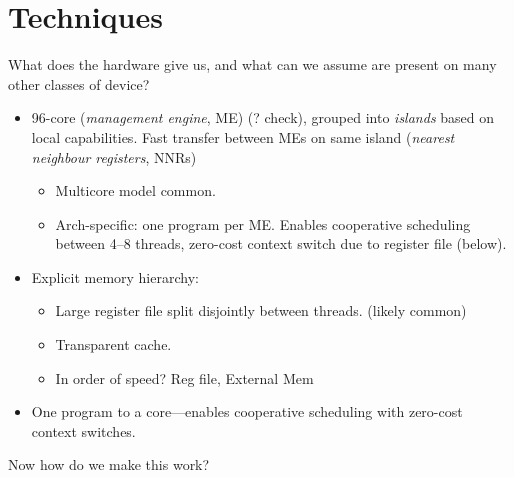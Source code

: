 \documentclass[sigconf,natbib=false]{acmart}
\begin{document}
\section{Techniques}

What does the hardware give us, and what can we assume are present on many other classes of device?
\begin{itemize}
	\item 96-core (\emph{management engine}, ME) (? check), grouped into \emph{islands} based on local capabilities. Fast transfer between MEs on same island (\emph{nearest neighbour registers}, NNRs)
	
	\begin{itemize}
		\item Multicore model common.
		\item Arch-specific: one program per ME. Enables cooperative scheduling between \numrange{4}{8} threads, zero-cost context switch due to register file (below).
	\end{itemize}

	\item Explicit memory hierarchy:
	
	\begin{itemize}
		\item Large register file split disjointly between threads. (likely common)
		\item Transparent cache.
		\item In order of speed? Reg file, External Mem
	\end{itemize}

	\item One program to a core---enables cooperative scheduling with zero-cost context switches.
	
\end{itemize}
Now how do we make this work?
\end{document}
